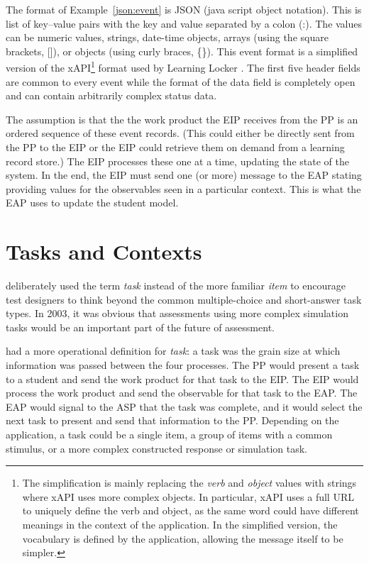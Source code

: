 \documentclass{article}
\begin{document}
  The format of Example~\ref{json:event} is JSON (java script object
  notation).  This is list of key--value pairs with the key and value
  separated by a colon (:).  The values can be numeric values,
  strings, date-time objects, arrays (using the square brackets, []),
  or objects (using curly braces, \{\}).  This event format is a
  simplified version of the xAPI\footnote{The simplification is mainly
    replacing the \emph{verb} and \emph{object} values with strings
    where xAPI uses more complex objects.  In particular, xAPI uses a
    full URL to uniquely define the verb and object, as the same word
    could have different meanings in the context of the application.
    In the simplified version, the vocabulary is defined by the
    application, allowing the message itself to be simpler.} format
  used by Learning Locker \cite{xAPI}.  The first five header fields
  are common to every event while the format of the data field is
  completely open and can contain arbitrarily complex status data.

  The assumption is that the the work product the EIP receives from
  the PP is an ordered sequence of these event records.  (This could
  either be directly sent from the PP to the EIP or the EIP could
  retrieve them on demand from a learning record store.)  The EIP
  processes these one at a time, updating the state of the system.  In
  the end, the EIP must send one (or more) message to the EAP stating
  providing values for the observables seen in a particular context.
  This is what the EAP uses to update the student model.
  
  \section{Tasks and Contexts}
  \label{sec:context}

   deliberately used the term \textit{task}
  instead of the more familiar \textit{item} to encourage test
  designers to think beyond the common multiple-choice and
  short-answer task types. In 2003, it was obvious that assessments
  using more complex simulation tasks would be an important part of
  the future of assessment.

   had a more operational definition for \textit{task}:  a
  task was the grain size at which information was passed between the
  four processes.  The PP would present a task to a student and
  send the work product for that task to the EIP.  The EIP would
  process the work product and send the observable for that task to
  the EAP.  The EAP would signal to the ASP that the task was
  complete, and it would select the next task to present and send that
  information to the PP.  Depending on the application, a task could
  be a single item, a group of items with a common stimulus, or a more
  complex constructed response or simulation task.
\end{document}
